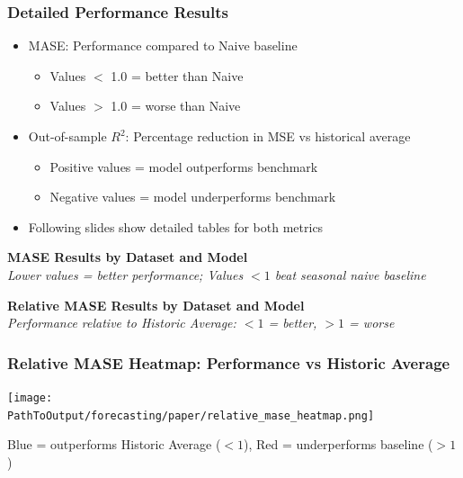 \documentclass[ignorenonframetext, 9pt]{beamer}
\begin{document}
\begin{frame}
    \frametitle{Detailed Performance Results}
    \begin{itemize}
    \item MASE: Performance compared to Naive baseline
    \begin{itemize}
      \item Values $<$ 1.0 = better than Naive
      \item Values $>$ 1.0 = worse than Naive
    \end{itemize}
    \item Out-of-sample $R^2$: Percentage reduction in MSE vs historical average
    \begin{itemize}
      \item Positive values = model outperforms benchmark
      \item Negative values = model underperforms benchmark
    \end{itemize}
    \item Following slides show detailed tables for both metrics
    \end{itemize}
  \end{frame}
  
\begin{frame}[plain]
    \tiny
    \vspace{-0.2cm}
    \centering
    \textbf{MASE Results by Dataset and Model}\\
    {\scriptsize \textit{Lower values = better performance; Values $<1$ beat seasonal naive baseline}}\\
    \vspace{0.2cm}
    \resizebox{0.98\textwidth}{!}{}
  \end{frame}
  
  \begin{frame}[plain]
    \tiny
    \vspace{-0.2cm}
    \centering
    \textbf{Relative MASE Results by Dataset and Model}\\
    {\scriptsize \textit{Performance relative to Historic Average: $<1$ = better, $>1$ = worse}}\\
    \vspace{0.2cm}
    \resizebox{0.98\textwidth}{!}{}
  \end{frame}

\begin{frame}
  \frametitle{Relative MASE Heatmap: Performance vs Historic Average}
  \centering
  \texttt{[image: \\PathToOutput/forecasting/paper/relative\_mase\_heatmap.png]}
  \vspace{0.2cm}

  Blue = outperforms Historic Average ($<1$), Red = underperforms baseline ($>1$)
\end{frame}
\end{document}
